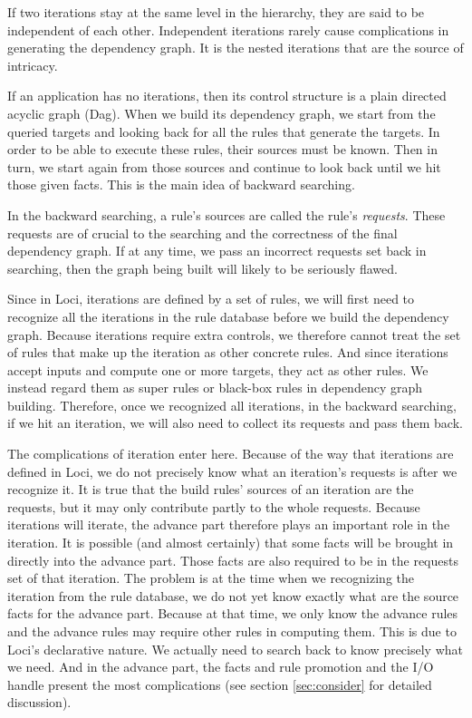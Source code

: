 \documentclass{article}
\begin{document}
If two iterations stay at the same level in the hierarchy, they are
said to be independent of each other. Independent iterations rarely
cause complications in generating the dependency graph. It is the
nested iterations that are the source of intricacy. 

If an application has no iterations, then its control structure is a
plain directed acyclic graph (Dag). When we build its dependency
graph, we start from the queried targets and looking back for all the
rules that generate the targets. In order to be able to execute
these rules, their sources must be known. Then in turn, we start again
from those sources and continue to look back until we hit those given
facts. This is the main idea of backward searching. 

In the backward searching, a rule's sources are called the rule's
{\it requests}. These requests are of crucial to the searching and the
correctness of the final dependency graph. If at any time, we pass an
incorrect requests set back in searching, then the graph being built
will likely to be seriously flawed. 

Since in Loci, iterations are defined by a set of rules, we will first
need to recognize all the iterations in the rule database before we
build the dependency graph. Because iterations require extra controls,
we therefore cannot treat the set of rules that make up the iteration
as other concrete rules. And since iterations accept inputs and
compute one or more targets, they act as other rules. We instead
regard them as super rules or black-box rules in dependency graph
building. Therefore, once we recognized all iterations, in the
backward searching, if we hit an iteration, we will also need to
collect its requests and pass them back.

The complications of iteration enter here. Because of the way that
iterations are defined in Loci, we do not precisely know what an
iteration's requests is after we recognize it. It is true that the
build rules' sources of an iteration are the requests, but it may only
contribute partly to the whole requests. Because iterations will
iterate, the advance part therefore plays an important role in the
iteration. It is possible (and almost certainly) that some facts
will be brought in directly into the advance part. Those facts are
also required to be in the requests set of that iteration. The problem
is at the time when we recognizing the iteration from the rule
database, we do not yet know exactly what are the source facts for the
advance part. Because at that time, we only know the advance
rules and the advance rules may require other rules in computing
them. This is due to Loci's declarative nature. We actually need to
search back to know precisely what we need. And in the advance part,
the facts and rule promotion and the I/O handle present the most
complications (see section \ref{sec:consider} for detailed
discussion).
\end{document}

